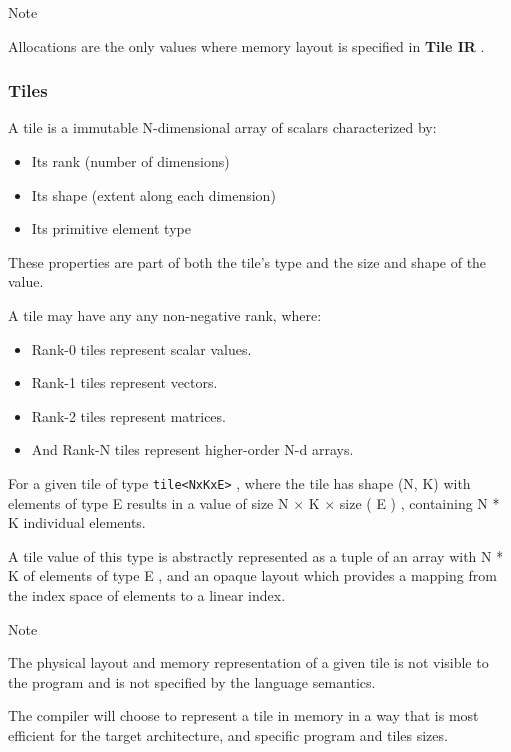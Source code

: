 \documentclass{article}
\begin{document}
Note


Allocations are the only values where memory layout is specified in \textbf{Tile IR} .




\subsubsection{Tiles}

A tile is a immutable N-dimensional array of scalars characterized by:


\begin{itemize}
\item Its rank (number of dimensions)
\item Its shape (extent along each dimension)
\item Its primitive element type

\end{itemize}
These properties are part of both the tile's type and the size and shape of the value.


A tile may have any any non-negative rank, where:


\begin{itemize}
\item Rank-0 tiles represent scalar values.
\item Rank-1 tiles represent vectors.
\item Rank-2 tiles represent matrices.
\item And Rank-N tiles represent higher-order N-d arrays.

\end{itemize}
For a given tile of type \texttt{tile<NxKxE>} , where the tile has shape (N, K) with elements of type E results in a value of size N × K × size ( E ) , containing N * K individual elements.


A tile value of this type is abstractly represented as a tuple of an array with N * K of elements of type E , and an opaque layout which provides a mapping from the index space of elements to a linear index.


Note


The physical layout and memory representation of a given tile is not visible to the program and is not specified by the language semantics.


The compiler will choose to represent a tile in memory in a way that is most efficient for the target architecture, and specific program and tiles sizes.
\end{document}
